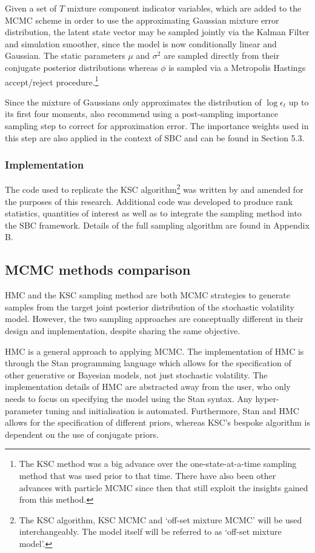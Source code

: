 \documentclass[12pt, a4paper]{article}
\begin{document}
        Given a set of $T$ mixture component indicator variables, which are added to the MCMC scheme in order to use the approximating Gaussian mixture error distribution, the latent state vector may be sampled jointly via the Kalman Filter and simulation smoother, since the model is now conditionally linear and Gaussian. The static parameters $\mu$ and $\sigma^2$ are sampled directly from their conjugate posterior distributions whereas $\phi$ is sampled via a Metropolis Hastings accept/reject procedure.\footnote{The KSC method was a big advance over the one-state-at-a-time sampling method that was used prior to that time. There have also been other advances with particle MCMC since then that still exploit the insights gained from this method.}

        Since the mixture of Gaussians only approximates the distribution of $\log \epsilon_t$ up to its first four moments, \citet{kim1998stochastic} also recommend using a post-sampling importance sampling step to correct for approximation error. The importance weights used in this step are also applied in the context of SBC and can be found in Section 5.3. 
        
        \subsubsection*{Implementation}
        The code used to replicate the KSC algorithm\footnote{The KSC algorithm, KSC MCMC and `off-set mixture MCMC' will be used interchangeably. The model itself will be referred to as `off-set mixture model'.} was written by \citet{chad2018} and amended for the purposes of this research. Additional code was developed to produce rank statistics, quantities of interest as well as to integrate the sampling method into the SBC framework. Details of the full sampling algorithm are found in Appendix B. 

        
    \subsection{MCMC methods comparison}
        HMC and the KSC sampling method are both MCMC strategies to generate samples from the target joint posterior distribution of the stochastic volatility model. However, the two sampling approaches are conceptually different in their design and implementation, despite sharing the same objective.

        HMC is a general approach to applying MCMC. The implementation of HMC is through the Stan programming language which allows for the specification of other generative or Bayesian models, not just stochastic volatility. The implementation details of HMC are abstracted away from the user, who only needs to focus on specifying the model using the Stan syntax. Any hyper-parameter tuning and initialisation is automated. Furthermore, Stan and HMC allows for the specification of different priors, whereas KSC's bespoke algorithm is dependent on the use of conjugate priors. 
        
\end{document}
